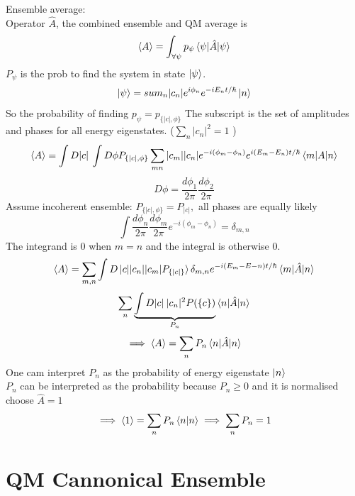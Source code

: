 \documentclass[11pt]{book}
\theoremstyle{definition}
\begin{document}
Ensemble average:\\
Operator $ \hat A $, the combined ensemble and QM average is
\[ \langle A \rangle = \int_{\forall \psi} p_{\psi} \braket{\psi|\hat A|\psi}\] 
$ P_{\psi} $ is the prob to find the system in state $ \ket{\psi} $.\\
\[ \ket{\psi} = sum_n |c_n| e^{i\phi_n} e^{-iE_nt/\hbar} \ket{n} \] 
So the probability of finding $ p_{\psi} = p_{\{|c|, \phi\}}$ 
The subscript is the set of amplitudes and phases for all energy eigenstates. ($ \sum_n |c_n|^2 = 1 $ )
\[ \langle A \rangle = \int D|c| \: \int D\phi P_{\{|c|, \phi\}} \sum_{mn} |c_m||c_n| e^{-i(\phi_m-\phi_n)} e^{i(E_m-E_n)t/\hbar} \braket{m|A|n}\]
\[ D\phi  = \frac{d\phi_1}{2\pi} \frac{d\phi_2}{2\pi} \] 
Assume incoherent ensemble: $P_{\{|c|, \phi\}} = P_{|c|}, $ all phases are equally likely
\[ \int \frac{d\phi_n}{2\pi} \frac{d\phi_m}{2\pi} e^{-i(\phi_m-\phi_n)} = \delta_{m,n} \] 
The integrand is $ 0 $ when $ m=n $ and the integral is otherwise $ 0 $.
\[ \langle A \rangle = \sum_{m,n} \int D\ket{c| |c_n||c_m| P_{\{|c|\}}} \delta_{m,n} e^{-i(E_m-E-n)t/\hbar} \braket{m|\hat A|n} \] 
\[ \sum_n 
	\underbrace{\int D|c| \: |c_n|^2 P(\{c\}) }_{P_n}
\braket{n|\hat A|n}  \] 
\[ \implies \langle A \rangle = \sum_n P_n \braket{n|\hat A|n} \] 
One cam interpret $ P_n $ as the probability of energy eigenstate $ \ket{n} $ \\
$ P_n $ can be interpreted as the probability because $ P_n \geq 0 $ and it is normalised choose $ \hat A =1  $   
\[ \implies \langle 1 \rangle = \sum_n P_n \braket{n|n} \implies \sum_n P_n = 1 \] 

\section{QM Cannonical Ensemble}
\end{document}
